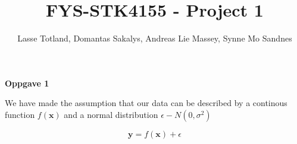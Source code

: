 \documentclass[11pt,a4paper]{report}
\begin{document}
\title{FYS-STK4155 - Project 1}
\author{Lasse Totland, Domantas Sakalys, Andreas Lie Massey, Synne Mo Sandnes}
\maketitle

\item[\bf{Oppgave 1}]


    We have made the assumption that our data can be described by a continous function $f(\textbf{x})$ and a normal distribution $\epsilon - N(0, \sigma^2)$

	\begin{enumerate}

    \begin{equation}
        \textbf{y} = f(\textbf{x}) + \epsilon
    \end{equation}

    



			
	
		\end{enumerate}
\end{document}

